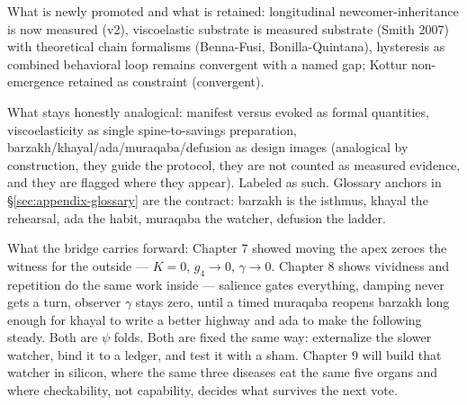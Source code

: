 What is newly promoted and what is retained: longitudinal newcomer-inheritance is now measured (v2), viscoelastic substrate is measured substrate (Smith 2007) with theoretical chain formalisms (Benna-Fusi, Bonilla-Quintana), hysteresis as combined behavioral loop remains convergent with a named gap; Kottur non-emergence retained as constraint (convergent).

What stays honestly analogical: manifest versus evoked as formal quantities, viscoelasticity as single spine-to-savings preparation, barzakh/khayal/ada/muraqaba/defusion as design images (analogical by construction, they guide the protocol, they are not counted as measured evidence, and they are flagged where they appear). Labeled as such. Glossary anchors in \S\ref{sec:appendix-glossary} are the contract: barzakh is the isthmus, khayal the rehearsal, ada the habit, muraqaba the watcher, defusion the ladder.

What the bridge carries forward: Chapter 7 showed moving the apex zeroes the witness for the outside --- $K=0$, $g_4\to0$, $\gamma\to0$. Chapter 8 shows vividness and repetition do the same work inside --- salience gates everything, damping never gets a turn, observer $\gamma$ stays zero, until a timed muraqaba reopens barzakh long enough for khayal to write a better highway and ada to make the following steady. Both are $\psi$ folds. Both are fixed the same way: externalize the slower watcher, bind it to a ledger, and test it with a sham. Chapter 9 will build that watcher in silicon, where the same three diseases eat the same five organs and where checkability, not capability, decides what survives the next vote.
